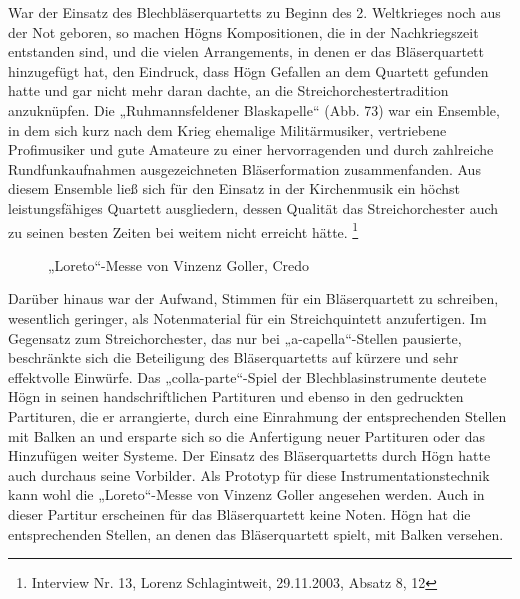 War der Einsatz des Blechbläserquartetts zu Beginn des 2. Weltkrieges
noch aus der Not geboren, so machen Högns Kompositionen, die in der
Nachkriegszeit entstanden sind, und die vielen Arrangements, in denen
er das Bläserquartett hinzugefügt hat, den Eindruck, dass Högn Gefallen
an dem Quartett gefunden hatte und gar nicht mehr daran dachte, an die
Streichorchestertradition anzuknüpfen. Die „Ruhmannsfeldener
Blaskapelle“ (Abb. 73) war ein Ensemble, in dem sich kurz nach dem
Krieg ehemalige Militärmusiker, vertriebene Profimusiker und gute
Amateure zu einer hervorragenden und durch zahlreiche Rundfunkaufnahmen
ausgezeichneten Bläserformation zusammenfanden. Aus diesem Ensemble
ließ sich für den Einsatz in der Kirchenmusik ein höchst
leistungsfähiges Quartett ausgliedern, dessen Qualität das
Streichorchester auch zu seinen besten Zeiten bei weitem nicht erreicht
hätte. \footnote{Interview Nr. 13, Lorenz Schlagintweit, 29.11.2003,
Absatz 8, 12}

\begin{figure}
\caption{„Loreto“-Messe von Vinzenz Goller, Credo}
\end{figure}

Darüber hinaus war der Aufwand, Stimmen für ein Bläserquartett zu
schreiben, wesentlich geringer, als Notenmaterial für ein
Streichquintett anzufertigen. Im Gegensatz zum Streichorchester, das
nur bei „a-capella“-Stellen pausierte, beschränkte sich die Beteiligung
des Bläserquartetts auf kürzere und sehr effektvolle Einwürfe. Das
„colla-parte“-Spiel der Blechblasinstrumente deutete Högn in seinen
handschriftlichen Partituren und ebenso in den gedruckten Partituren,
die er arrangierte, durch eine Einrahmung der entsprechenden Stellen
mit Balken an und ersparte sich so die Anfertigung neuer Partituren
oder das Hinzufügen weiter Systeme. Der Einsatz des Bläserquartetts
durch Högn hatte auch durchaus seine Vorbilder. Als Prototyp für diese
Instrumentationstechnik kann wohl die „Loreto“-Messe von Vinzenz Goller
angesehen werden. Auch in dieser Partitur erscheinen für das
Bläserquartett keine Noten. Högn hat die entsprechenden Stellen, an
denen das Bläserquartett spielt, mit Balken versehen.

